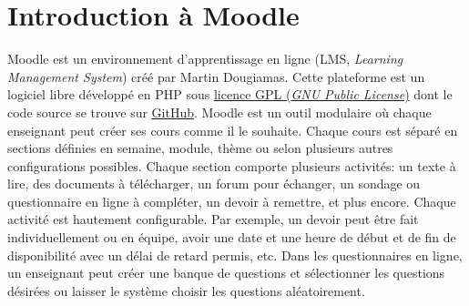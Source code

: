 ﻿\chapter{Introduction \`a Moodle}
Moodle est un environnement d'apprentissage en ligne (LMS, \textit{Learning Management System}) cr\'e\'e par Martin Dougiamas.
Cette plateforme est un logiciel libre d\'evelopp\'e en PHP sous \href{http://docs.moodle.org/dev/License}{licence GPL (\textit{GNU Public License})} dont le code source se trouve sur \href{https://github.com/moodle/moodle}{GitHub}.
Moodle est un outil modulaire o\`u chaque enseignant peut cr\'eer ses cours comme il le souhaite.
Chaque cours est s\'epar\'e en sections d\'efinies en semaine, module, th\`eme ou selon plusieurs autres configurations possibles.
Chaque section comporte plusieurs activit\'es: un texte \`a lire, des documents \`a t\'el\'echarger, un forum pour \'echanger, un sondage ou questionnaire en ligne \`a compl\'eter, un devoir \`a remettre, et plus encore.
Chaque activit\'e est hautement configurable.
Par exemple, un devoir peut \^etre fait individuellement ou en \'equipe, avoir une date et une heure de d\'ebut et de fin de disponibilit\'e avec un d\'elai de retard permis, etc.
Dans les questionnaires en ligne, un enseignant peut cr\'eer une banque de questions et s\'electionner les questions d\'esir\'ees ou laisser le syst\`eme choisir les questions al\'eatoirement.
